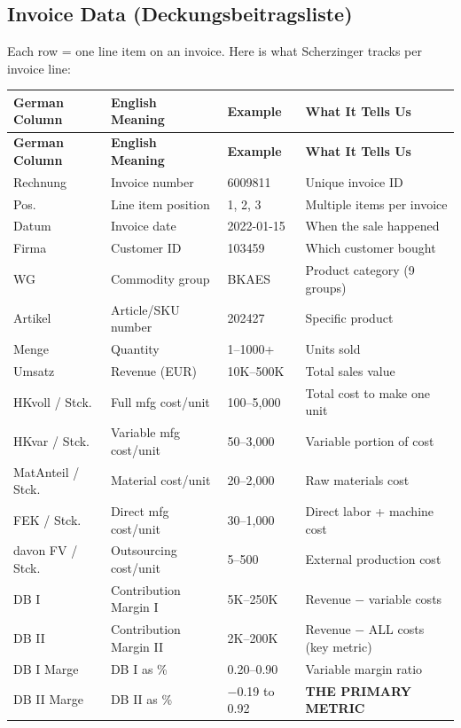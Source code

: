 \documentclass[11pt,a4paper]{article}
\begin{document}
\subsection{Invoice Data (Deckungsbeitragsliste)}

Each row = one line item on an invoice. Here is what Scherzinger tracks per invoice line:

\begin{longtable}{p{3.5cm} p{4cm} p{2.5cm} p{4.5cm}}
\toprule
\textbf{German Column} & \textbf{English Meaning} & \textbf{Example} & \textbf{What It Tells Us} \\
\midrule
\endfirsthead
\toprule
\textbf{German Column} & \textbf{English Meaning} & \textbf{Example} & \textbf{What It Tells Us} \\
\midrule
\endhead
Rechnung & Invoice number & 6009811 & Unique invoice ID \\
Pos. & Line item position & 1, 2, 3 & Multiple items per invoice \\
Datum & Invoice date & 2022-01-15 & When the sale happened \\
Firma & Customer ID & 103459 & Which customer bought \\
WG & Commodity group & BKAES & Product category (9 groups) \\
Artikel & Article/SKU number & 202427 & Specific product \\
Menge & Quantity & 1--1000+ & Units sold \\
Umsatz & Revenue (EUR) & 10K--500K & Total sales value \\
HKvoll / Stck. & Full mfg cost/unit & 100--5{,}000 & Total cost to make one unit \\
HKvar / Stck. & Variable mfg cost/unit & 50--3{,}000 & Variable portion of cost \\
MatAnteil / Stck. & Material cost/unit & 20--2{,}000 & Raw materials cost \\
FEK / Stck. & Direct mfg cost/unit & 30--1{,}000 & Direct labor + machine cost \\
davon FV / Stck. & Outsourcing cost/unit & 5--500 & External production cost \\
DB I & Contribution Margin I & 5K--250K & Revenue $-$ variable costs \\
DB II & Contribution Margin II & 2K--200K & Revenue $-$ ALL costs (key metric) \\
DB I Marge & DB I as \% & 0.20--0.90 & Variable margin ratio \\
DB II Marge & DB II as \% & $-$0.19 to 0.92 & \textbf{THE PRIMARY METRIC} \\
\bottomrule
\end{longtable}
\end{document}
